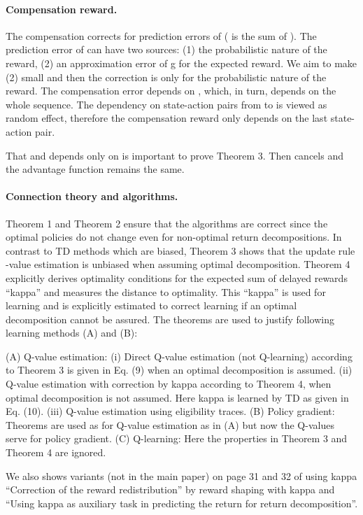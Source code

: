 \documentclass{article}
\begin{document}
\begin{appendices}
\paragraph{Compensation reward.} The compensation corrects for prediction errors of  ( is the sum of ). 
The prediction error of  can have two sources: 
(1) the probabilistic nature of the reward, 
(2) an approximation error of g for the expected reward. 
We aim to make (2) small and then the correction is only for the probabilistic nature of the reward.
The compensation error depends on , which, in turn, depends on the whole sequence. 
The dependency on state-action pairs from  to  is viewed as random effect, 
therefore the compensation reward only depends on the last state-action pair. 

That  and  depends only on  
is important to prove Theorem 3. Then  cancels and the advantage function remains the same.


\paragraph{Connection theory and algorithms.}
Theorem 1 and Theorem 2 ensure that the algorithms are correct since 
the optimal policies do not change even for non-optimal return decompositions. 
In contrast to TD methods which are biased, 
Theorem 3 shows that the update rule -value estimation 
is unbiased when assuming optimal decomposition. 
Theorem 4 explicitly derives optimality conditions 
for the expected sum of delayed rewards “kappa” 
and measures the distance to optimality. 
This “kappa” is used for learning and 
is explicitly estimated to correct learning 
if an optimal decomposition cannot be assured. 
The theorems are used to justify following learning methods (A) and (B):

(A) Q-value estimation: 
(i) Direct Q-value estimation (not Q-learning) according to Theorem 3 is given in Eq. (9) when an optimal decomposition is assumed.
(ii) Q-value estimation with correction by kappa according to Theorem 4, when optimal decomposition is not assumed. 
Here kappa is learned by TD as given in Eq. (10). (iii) Q-value estimation using eligibility traces.
(B) Policy gradient: Theorems are used as for Q-value estimation as in (A) 
but now the Q-values serve for policy gradient.
(C) Q-learning: Here the properties in Theorem 3 and Theorem 4 are ignored.

We also shows variants (not in the main paper) on page 31 and 32 of using kappa “Correction of the reward redistribution” 
by reward shaping with kappa and 
“Using kappa as auxiliary task in predicting the return for return decomposition”.


\end{appendices}
\end{document}

